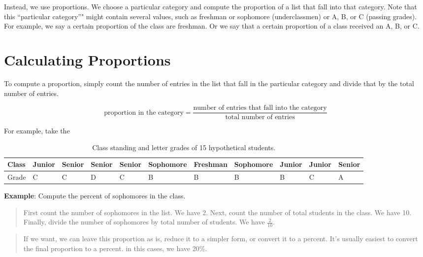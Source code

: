 \documentclass[]{book}
\theoremstyle{definition}
\theoremstyle{definition}
\theoremstyle{definition}
\theoremstyle{remark}
\begin{document}
Instead, we use proportions. We choose a particular category and compute
the proportion of a list that fall into that category. Note that this
``particular category''" might contain several values, such as freshman
or sophomore (underclassmen) or A, B, or C (passing grades). For
example, we say a certain proportion of the class are freshman. Or we
say that a certain proportion of a class received an A, B, or C.

\section{Calculating Proportions}\label{calculating-proportions}

To compute a proportion, simply count the number of entries in the list
that fall in the particular category and divide that by the total number
of entries.

\[\text{proportion in the category} = \dfrac{\text{number of entries that fall into the category}}{\text{total number of entries}}\]

For example, take the

\begin{table}

\caption{\label{tab:unnamed-chunk-1}Class standing and letter grades of 15 hypothetical students.}
\centering
\begin{tabular}[t]{l|l|l|l|l|l|l|l|l|l|l}
\hline
Class & Junior & Senior & Senior & Senior & Sophomore & Freshman & Sophomore & Junior & Junior & Senior\\
\hline
Grade & C & C & D & C & B & B & B & B & C & A\\
\hline
\end{tabular}
\end{table}

\textbf{Example}: Compute the percent of sophomores in the class.

\begin{quote}
First count the number of sophomores in the list. We have 2. Next, count
the number of total students in the class. We have 10. Finally, divide
the number of sophomores by total number of students. We have
\(\frac{2}{10}\).
\end{quote}

\begin{quote}
If we want, we can leave this proportion as is, reduce it to a simpler
form, or convert it to a percent. It's usually easiest to convert the
final proportion to a percent. in this cases, we have 20\%.
\end{quote}
\end{document}
